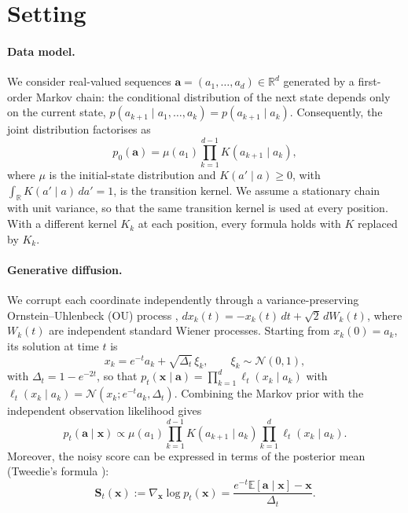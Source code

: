 \documentclass{article}
\begin{document}
\section{Setting}
\label{sec:setting}

\paragraph{Data model.}
We consider real-valued sequences $\mathbf{a}=(a_1,\ldots,a_d)\in\mathbb{R}^d$ generated by a first-order Markov chain:
the conditional distribution of the next state depends only on the current state,
$p(a_{k+1}\mid a_1,\ldots,a_k)=p(a_{k+1}\mid a_k)$. Consequently, the joint distribution factorises as
\begin{equation}
p_0(\mathbf{a})
=
\mu(a_1)
\prod_{k=1}^{d-1}
K(a_{k+1}\mid a_k),
\label{eq:markov_prior}
\end{equation}
where $\mu$ is the initial-state distribution and $K(a'\mid a)\geq0$, with $\int_{\mathbb{R}}K(a'\mid a)\,da'=1$, is the
transition kernel. We assume a stationary chain with unit variance, so that the same transition kernel is used at every
position. With a different kernel $K_k$ at each position, every formula holds with $K$ replaced by $K_k$.

\paragraph{Generative diffusion.}
We corrupt each coordinate independently through a variance-preserving Ornstein--Uhlenbeck (OU) process
\cite{song2021scorebased}, $dx_k(t)=-x_k(t)\,dt+\sqrt{2}\,dW_k(t)$, where $W_k(t)$ are independent standard Wiener
processes. Starting from $x_k(0)=a_k$, its solution at time $t$ is
\begin{equation}
x_k=e^{-t}a_k+\sqrt{\Delta_t}\,\xi_k,
\qquad
\xi_k\sim\mathcal{N}(0,1),
\label{eq:ou_corruption}
\end{equation}
with $\Delta_t=1-e^{-2t}$, so that $p_t(\mathbf{x}\mid\mathbf{a})=\prod_{k=1}^{d}\ell_t(x_k\mid a_k)$ with
$\ell_t(x_k\mid a_k)=\mathcal{N}(x_k;e^{-t}a_k,\Delta_t)$. Combining the Markov prior with the independent observation
likelihood gives
\begin{equation}
p_t(\mathbf{a}\mid\mathbf{x})
\propto
\mu(a_1)
\prod_{k=1}^{d-1}K(a_{k+1}\mid a_k)
\prod_{k=1}^{d}\ell_t(x_k\mid a_k).
\label{eq:posterior_chain}
\end{equation}
Moreover, the noisy score can be expressed in terms of the posterior mean (Tweedie's formula
\cite{robbins1956empirical,efron2011tweedie}):
\begin{equation}
    \mathbf S_t(\mathbf x)
    := \nabla_{\mathbf x}\log p_t(\mathbf x)
    =
    \frac{e^{-t}\mathbb E[\mathbf a\mid\mathbf x]-\mathbf x}
         {\Delta_t}.
    \label{eq:tweedie}
\end{equation}
\end{document}
